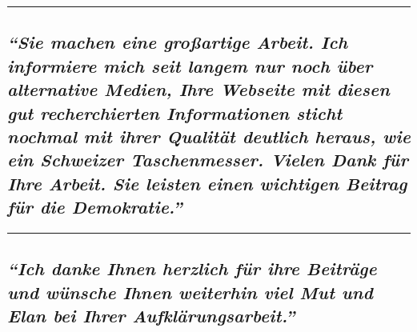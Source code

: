 \begin{center}\rule{0.5\linewidth}{\linethickness}\end{center}

\hypertarget{sie-machen-eine-grouxdfartige-arbeit-ich-informiere-mich-seit-langem-nur-noch-uxfcber-alternative-medien-ihre-webseite-mit-diesen-gut-recherchierten-informationen-sticht-nochmal-mit-ihrer-qualituxe4t-deutlich-heraus-wie-ein-schweizer-taschenmesser-vielen-dank-fuxfcr-ihre-arbeit-sie-leisten-einen-wichtigen-beitrag-fuxfcr-die-demokratie}{%
\subsection{\texorpdfstring{\emph{``Sie machen eine großartige Arbeit.
Ich informiere mich seit langem nur noch über alternative Medien, Ihre
Webseite mit diesen gut recherchierten Informationen sticht nochmal mit
ihrer Qualität deutlich heraus, wie ein Schweizer Taschenmesser. Vielen
Dank für Ihre Arbeit. Sie leisten einen wichtigen Beitrag für die
Demokratie.''}}{``Sie machen eine großartige Arbeit. Ich informiere mich seit langem nur noch über alternative Medien, Ihre Webseite mit diesen gut recherchierten Informationen sticht nochmal mit ihrer Qualität deutlich heraus, wie ein Schweizer Taschenmesser. Vielen Dank für Ihre Arbeit. Sie leisten einen wichtigen Beitrag für die Demokratie.''}}\label{sie-machen-eine-grouxdfartige-arbeit-ich-informiere-mich-seit-langem-nur-noch-uxfcber-alternative-medien-ihre-webseite-mit-diesen-gut-recherchierten-informationen-sticht-nochmal-mit-ihrer-qualituxe4t-deutlich-heraus-wie-ein-schweizer-taschenmesser-vielen-dank-fuxfcr-ihre-arbeit-sie-leisten-einen-wichtigen-beitrag-fuxfcr-die-demokratie}}

\begin{center}\rule{0.5\linewidth}{\linethickness}\end{center}

\hypertarget{ich-danke-ihnen-herzlich-fuxfcr-ihre-beitruxe4ge-und-wuxfcnsche-ihnen-weiterhin-viel-mut-und-elan-bei-ihrer-aufkluxe4rungsarbeit}{%
\subsection{\texorpdfstring{\emph{``Ich danke Ihnen herzlich für ihre
Beiträge und wünsche Ihnen weiterhin viel Mut und Elan bei Ihrer
Aufklärungsarbeit.''}}{``Ich danke Ihnen herzlich für ihre Beiträge und wünsche Ihnen weiterhin viel Mut und Elan bei Ihrer Aufklärungsarbeit.''}}\label{ich-danke-ihnen-herzlich-fuxfcr-ihre-beitruxe4ge-und-wuxfcnsche-ihnen-weiterhin-viel-mut-und-elan-bei-ihrer-aufkluxe4rungsarbeit}}

